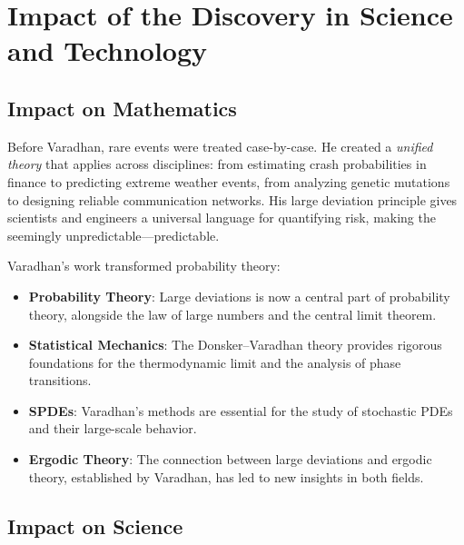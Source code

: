 \section{Impact of the Discovery in Science and Technology}

\subsection{Impact on Mathematics}

\begin{whyitmatters}
Before Varadhan, rare events were treated case-by-case. He created a \emph{unified theory} that applies across disciplines: from estimating crash probabilities in finance to predicting extreme weather events, from analyzing genetic mutations to designing reliable communication networks. His large deviation principle gives scientists and engineers a universal language for quantifying risk, making the seemingly unpredictable---predictable.
\end{whyitmatters}

Varadhan's work transformed probability theory:

\begin{itemize}
\item \textbf{Probability Theory}: Large deviations is now a central part of probability theory, alongside the law of large numbers and the central limit theorem.

\item \textbf{Statistical Mechanics}: The Donsker--Varadhan theory provides rigorous foundations for the thermodynamic limit and the analysis of phase transitions.

\item \textbf{SPDEs}: Varadhan's methods are essential for the study of stochastic PDEs and their large-scale behavior.

\item \textbf{Ergodic Theory}: The connection between large deviations and ergodic theory, established by Varadhan, has led to new insights in both fields.
\end{itemize}

\subsection{Impact on Science}

